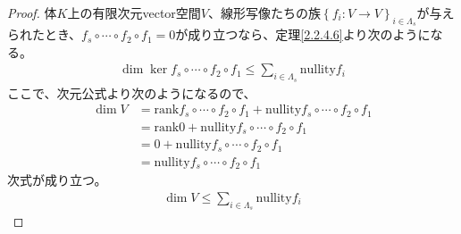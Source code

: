 \documentclass[dvipdfmx]{jsarticle}
\begin{document}
\begin{proof}
体$K$上の有限次元vector空間$V$、線形写像たちの族$\left\{ f_{i}:V \rightarrow V \right\}_{i \in \varLambda_{s}}$が与えられたとき、$f_{s} \circ \cdots \circ f_{2} \circ f_{1} = 0$が成り立つなら、定理\ref{2.2.4.6}より次のようになる。
\begin{align*}
\dim{\ker{f_{s} \circ \cdots \circ f_{2} \circ f_{1}}} \leq \sum_{i \in \varLambda_{s}} {{\mathrm{nullity}}f_{i}}
\end{align*}
ここで、次元公式より次のようになるので、
\begin{align*}
\dim V &= {\mathrm{rank}}{f_{s} \circ \cdots \circ f_{2} \circ f_{1}} + {\mathrm{nullity}}{f_{s} \circ \cdots \circ f_{2} \circ f_{1}}\\
&= {\mathrm{rank}}0 + {\mathrm{nullity}}{f_{s} \circ \cdots \circ f_{2} \circ f_{1}}\\
&= 0 + {\mathrm{nullity}}{f_{s} \circ \cdots \circ f_{2} \circ f_{1}}\\
&= {\mathrm{nullity}}{f_{s} \circ \cdots \circ f_{2} \circ f_{1}}
\end{align*}
次式が成り立つ。
\begin{align*}
\dim V \leq \sum_{i \in \varLambda_{s}} {{\mathrm{nullity}}f_{i}}
\end{align*}
\end{proof}
\end{document}
